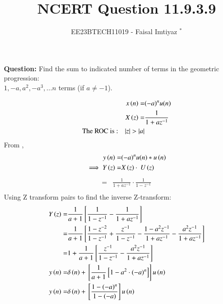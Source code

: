 \documentclass[journal,12pt,twocolumn]{IEEEtran}
\theoremstyle{remark}
\begin{document}

\vspace{3cm}
\title{NCERT Question 11.9.3.9}
\author{EE23BTECH11019 - Faisal Imtiyaz $^{*}$%
}
\maketitle
\newpage
\bigskip

\renewcommand{\thefigure}{\arabic{figure}}
\renewcommand{\thetable}{\arabic{table}}


\vspace{3cm}
\textbf{Question:} Find the sum to indicated number of terms in the geometric progression:\\
$1,-a, a^2, -a^3,...n$ terms (if $a\neq-1$).\\
\solution


\begin{align}
x\left(n\right) =& (-a)^{n}u(n)\\
X\left(z\right) =& \frac{1}{1+az^{-1}}\\
\text{The ROC is :} \quad |z| > |a|\\
\end{align}
From ,
\begin{align}
y\left(n\right)= &{(-a)^n}u(n)*u\left(n\right)\\
\implies Y\left(z\right)= &X\left(z\right)\cdot\ U\left(z\right)
\end{align}
\begin{align}
    = &\frac{1}{1+az^{-1}}\cdot\frac{1}{1-z^{-1}}\\
\end{align}
Using Z transform pairs  to find the inverse Z-transform:\\
\begin{align}
    Y\left(z\right)=& \frac{1}{a+1}{}\left[\frac{1}{1-z^{-1}} - \frac{1}{1+az^{-1}}\right]\\
    =& \frac{1}{a+1}{}\left[\frac{1-z^{-2}}{1-z^{-1}}+\frac{z^{-1}}{1-z^{-1}} -\frac{{1}-a^{2}z^{-1}}{1+az^{-1}} -\frac{a^{2}z^{-1}}{1+az^{-1}}\right]\\
    =& 1+\frac{1}{a+1}{}\left[\frac{z^{-1}}{1-z^{-1}}-\frac{a^{2}z^{-1}}{1+az^{-1}}\right]\\
    y\left(n\right) =& \delta\left(n\right) + {}\left[\frac{1}{a+1}{}\left[1- a^{2}\cdot(-a)^{n}\right]\right]u\left(n\right)\\
    y\left(n\right) =& \delta\left(n\right)+ {}\left[\frac{1-(-a)^{n}}{1-(-a)}\right]u\left(n\right)
\end{align}
\end{document}

